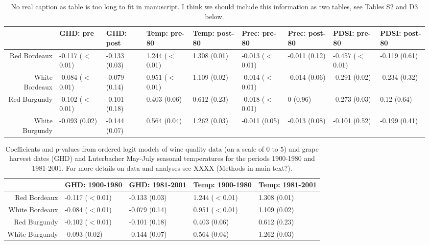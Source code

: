 \documentclass{article}
\begin{document}
\begin{table}[ht]
\centering
\caption{No real caption as table is too long to fit in manuscript. I think we should include this information as two tables, see Tables S2 and D3 below.} 
\begin{tabular}{r|ll|ll|ll|ll}
  \hline
 & GHD: pre & GHD: post & Temp: pre-80 & Temp: post-80 & Prec: pre-80 & Prec: post-80 & PDSI: pre-80 & PDSI: post-80 \\ 
  \hline
Red Bordeaux & -0.117 ($<$0.01) & -0.133 (0.03) & 1.244 ($<$0.01) & 1.308 (0.01) & -0.013 ($<$0.01) & -0.011 (0.12) & -0.457 ($<$0.01) & -0.119 (0.61) \\ 
  White Bordeaux & -0.084 ($<$0.01) & -0.079 (0.14) & 0.951 ($<$0.01) & 1.109 (0.02) & -0.014 ($<$0.01) & -0.014 (0.06) & -0.291 (0.02) & -0.234 (0.32) \\ 
  Red Burgundy & -0.102 ($<$0.01) & -0.101 (0.18) & 0.403 (0.06) & 0.612 (0.23) & -0.018 ($<$0.01) & 0 (0.96) & -0.273 (0.03) & 0.12 (0.64) \\ 
  White Burgundy & -0.093 (0.02) & -0.144 (0.07) & 0.564 (0.04) & 1.262 (0.03) & -0.011 (0.05) & -0.013 (0.08) & -0.101 (0.52) & -0.199 (0.41) \\ 
   \hline
\end{tabular}
\end{table}%
\begin{table}[ht]
\centering
\caption{Coefficients and p-values from ordered logit models of wine quality data (on a scale of 0 to 5) and grape harvest dates (GHD) and Luterbacher May-July seasonal temperatures for the periods 1900-1980 and 1981-2001. For more details on data and analyses see XXXX (Methods in main text?).} 
\begin{tabular}{||r||l|l||l|l||}
  \hline
 & GHD: 1900-1980 & GHD: 1981-2001 & Temp: 1900-1980 & Temp: 1981-2001 \\ 
  \hline
Red Bordeaux & -0.117 ($<$0.01) & -0.133 (0.03) & 1.244 ($<$0.01) & 1.308 (0.01) \\ 
  White Bordeaux & -0.084 ($<$0.01) & -0.079 (0.14) & 0.951 ($<$0.01) & 1.109 (0.02) \\ 
  Red Burgundy & -0.102 ($<$0.01) & -0.101 (0.18) & 0.403 (0.06) & 0.612 (0.23) \\ 
  White Burgundy & -0.093 (0.02) & -0.144 (0.07) & 0.564 (0.04) & 1.262 (0.03) \\ 
   \hline
\end{tabular}
\end{table}%
\end{document}
